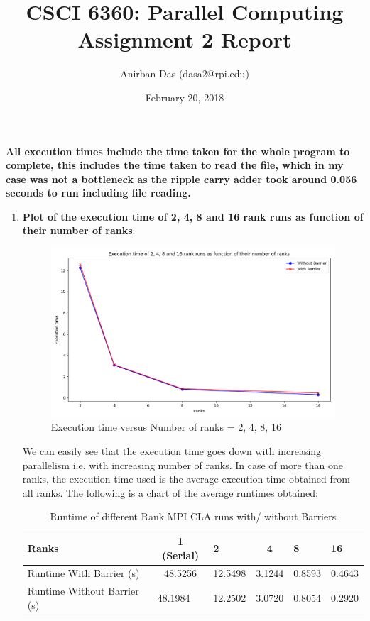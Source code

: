 \documentclass[a4paper,12 pt]{article}
\title{\vspace{-2.0cm}CSCI 6360: Parallel Computing Assignment 2 Report}
\author{Anirban Das (dasa2@rpi.edu) }
\date{February 20, 2018}
\begin{document}
\maketitle

\textbf{All execution times include the time taken for the whole program to complete, this includes the time taken to read the file, which in my case was not a bottleneck as the ripple carry adder took around 0.056 seconds to run including file reading.}
\begin{enumerate}
\item \textbf{Plot of the execution time of 2, 4, 8 and 16 rank runs as function of their number of ranks}:\\
\begin{figure}[H]
	\centering
	\includegraphics[width=.8\linewidth]{Graphs/graph_1.png}
  \caption{Execution time versus Number of ranks = 2, 4, 8, 16}
\end{figure}
We can easily see that the execution time goes down with increasing parallelism i.e. with increasing number of ranks. In case of more than one ranks, the execution time used is the average execution time obtained from all ranks. The following is a chart of the average runtimes obtained:
\begin{table}[]
\centering
\caption{Runtime of different Rank MPI CLA runs with/ without Barriers}
\label{my-label}
\begin{tabular}{|l|c|l|c|l|l|}
\hline
Ranks                       & 1 (Serial)                   & 2       & 4                           & 8      & 16     \\ \hline
Runtime With Barrier (s)    & 48.5256                      & 12.5498 & 3.1244                      & 0.8593 & 0.4643 \\ \hline
Runtime Without Barrier (s) & \multicolumn{1}{l|}{48.1984} & 12.2502 & \multicolumn{1}{l|}{3.0720} & 0.8054 & 0.2920 \\ \hline
\end{tabular}
\end{table}


\end{enumerate}
\end{document}
